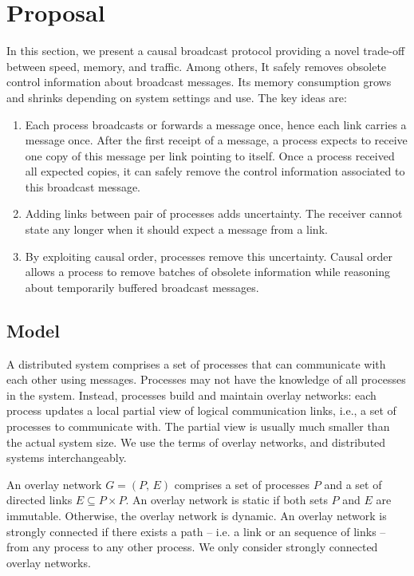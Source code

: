 
\section{Proposal}
\label{sec:proposal}

In this section, we present a causal broadcast protocol providing a novel
trade-off between speed, memory, and traffic. Among others, It safely removes
obsolete control information about broadcast messages. Its memory consumption
grows and shrinks depending on system settings and use.  The key ideas are:
\begin{enumerate}
\item Each process broadcasts or forwards a message once, hence each link
  carries a message once. After the first receipt of a message, a process
  expects to receive one copy of this message per link pointing to itself. Once
  a process received all expected copies, it can safely remove the control
  information associated to this broadcast message.
\item Adding links between pair of processes adds uncertainty. The receiver
  cannot state any longer when it should expect a message from a link.
\item By exploiting causal order, processes remove this uncertainty. Causal
  order allows a process to remove batches of obsolete information while
  reasoning about temporarily buffered broadcast messages.
\end{enumerate}

\subsection{Model}

A distributed system comprises a set of processes that can communicate with each
other using messages. Processes may not have the knowledge of all processes in
the system. Instead, processes build and maintain overlay networks: each process
updates a local partial view of logical communication links, i.e., a set of
processes to communicate with. The partial view is usually much smaller than the
actual system size. We use the terms of overlay networks, and distributed
systems interchangeably.

\begin{definition}
  An overlay network $G = (P,\, E)$ comprises a set of processes $P$ and a set
  of directed links $E \subseteq P \times P$.  An overlay network is static if
  both sets $P$ and $E$ are immutable. Otherwise, the overlay network is
  dynamic. An overlay network is strongly connected if there exists a path --
  i.e. a link or an sequence of links -- from any process to any other
  process. We only consider strongly connected overlay networks.
\end{definition}


